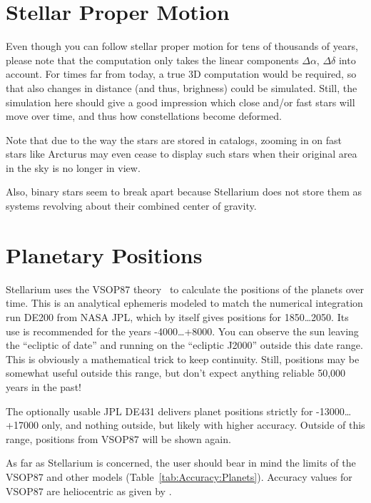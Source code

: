 \section{Stellar Proper Motion}
\label{sec:Accuracy:ProperMotion}

Even though you can follow stellar proper motion for tens of thousands of years, 
please note that the computation only takes the linear components $\Delta\alpha$, $\Delta\delta$ into account. 
For times far from today, a true 3D computation would be required, 
so that also changes in distance (and thus, brighness) could be simulated. 
Still, the simulation here should give a good impression which close and/or fast stars 
will move over time, and thus how constellations become deformed.

Note that due to the way the stars are stored in catalogs, zooming in on fast stars like Arcturus 
may even cease to display such stars when their original area in the sky is no longer in view.

Also, binary stars seem to break apart because Stellarium does not store them as systems 
revolving about their combined center of gravity.


\section{Planetary Positions}
\label{sec:Accuracy:Planets}

Stellarium uses the VSOP87 theory~\citep{1988A&A...202..309B} %
to calculate the positions of the planets over time.
This is an analytical ephemeris modeled to match the numerical
integration run DE200 from NASA JPL, which by itself gives positions for 1850\ldots2050. 
Its use is recommended for the years -4000\ldots+8000. You can observe the sun leaving the ``ecliptic
of date'' and running on the ``ecliptic J2000'' outside this date
range. This is obviously a mathematical trick to keep
continuity. Still, positions may be somewhat useful outside this
range, but don't expect anything reliable 50,000 years in the past! 

The optionally usable JPL DE431 delivers planet positions strictly for
-13000\ldots+17000 only, and nothing outside, but likely with higher accuracy. 
Outside of this range, positions from VSOP87 will be shown again.

As far as Stellarium is concerned, the user should bear in mind the
limits of the VSOP87 and other models (Table~\ref{tab:Accuracy:Planets}).
Accuracy values for VSOP87 are heliocentric as given by \citet{1988A&A...202..309B}.

